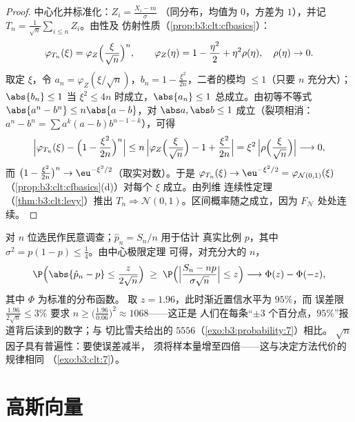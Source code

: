 \begin{proof}
中心化并标准化：$Z_i = \frac{X_i - m}{\sigma}$
（同分布，均值为 $0$，方差为 $1$），并记 $T_n =
\frac1{\sqrt n}\sum_{i\leq n}Z_i$。由性及
仿射性质（\cref{prop:b3:clt:cfbasics}）：
\[
\varphi_{T_n}(\xi) =
\varphi_{Z}\Bigl(\frac{\xi}{\sqrt n}\Bigr)^{n},
\qquad
\varphi_Z(\eta) = 1 - \frac{\eta^2}2 + \eta^2\rho(\eta),\quad
\rho(\eta)\to0 .
\]
取定 $\xi$，令 $a_n = \varphi_Z(\xi/\sqrt n)$，$b_n = 1 -
\frac{\xi^2}{2n}$，二者的模均 $\leq 1$（只要 $n$ 充分大）；
$\abs{b_n} \leq 1$ 当 $\xi^2 \leq 4n$ 时成立，$\abs{a_n} \leq 1$
总成立。由初等不等式 $\abs{a^n - b^n} \leq
n\abs{a - b}$，对 $\abs a, \abs b \leq 1$ 成立（裂项相消：
$a^n - b^n = \sum a^k(a - b)b^{n-1-k}$），可得
\[
\Bigl|\varphi_{T_n}(\xi) - \Bigl(1 -
\frac{\xi^2}{2n}\Bigr)^{n}\Bigr|
\leq n\,\Bigl|\varphi_Z\Bigl(\frac\xi{\sqrt n}\Bigr) - 1 +
\frac{\xi^2}{2n}\Bigr|
= \xi^2\,\Bigl|\rho\Bigl(\frac{\xi}{\sqrt n}\Bigr)\Bigr|
\longrightarrow 0,
\]
而 $\bigl(1 - \frac{\xi^2}{2n}\bigr)^n \to
\eu^{-\xi^2/2}$（取实对数）。于是 $\varphi_{T_n}(\xi) \to
\eu^{-\xi^2/2} = \varphi_{\mathcal N(0,1)}(\xi)$
（\cref{prop:b3:clt:cfbasics}(d)）对每个 $\xi$ 成立。由列维
连续性定理（\cref{thm:b3:clt:levy}）推出 $T_n \Rightarrow \mathcal
N(0,1)$。区间概率随之成立，因为 $F_{\mathcal
N}$ 处处连续。
\end{proof}

\begin{example}
\label{ex:b3:clt:confidence}
对 $n$ 位选民作民意调查；$\hat p_n = S_n/n$ 用于估计
真实比例 $p$，其中 $\sigma^2 = p(1-p) \leq \frac14$。由中心极限定理
可得，对充分大的 $n$，
\[
\P\Bigl(\abs{\hat p_n - p} \leq
\frac{z}{2\sqrt n}\Bigr)
\;\geq\; \P\Bigl(\Bigl|\frac{S_n - np}{\sigma\sqrt n}\Bigr|
\leq z\Bigr)
\longrightarrow \Phi(z) - \Phi(-z),
\]
其中 $\Phi$ 为标准的分布函数。
取 $z = 1.96$，此时渐近置信水平为 $95\%$，而
误差限 $\frac{1.96}{2\sqrt n} \leq 3\%$ 要求 $n \geq
\bigl(\frac{1.96}{0.06}\bigr)^2 \approx 1068$——这正是
人们在每条“$\pm3$ 个百分点，$95\%$”报道背后读到的数字；与
切比雪夫给出的 $5556$（\cref{exo:b3:probability:7}）相比。
$\sqrt n$ 因子具有普遍性：要使误差减半，
须将样本量增至四倍——这与决定方法代价的规律相同
（\cref{exo:b3:clt:7}）。
\end{example}

\section{高斯向量}

